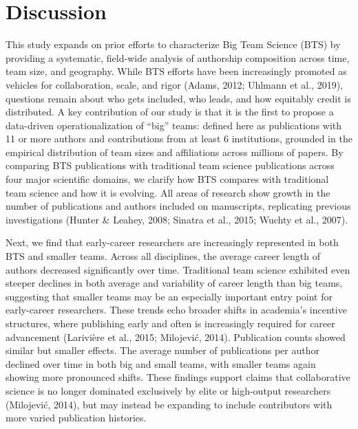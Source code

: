 \documentclass[
  man,floatsintext]{apa7}
\begin{document}
\section{Discussion}\label{discussion}

This study expands on prior efforts to characterize Big Team Science
(BTS) by providing a systematic, field-wide analysis of authorship
composition across time, team size, and geography. While BTS efforts
have been increasingly promoted as vehicles for collaboration, scale,
and rigor (Adams, 2012; Uhlmann et al., 2019), questions remain about who gets
included, who leads, and how equitably credit is distributed. A key
contribution of our study is that it is the first to propose a
data-driven operationalization of ``big'' teams: defined here as
publications with 11 or more authors and contributions from at least 6
institutions, grounded in the empirical distribution of team sizes and
affiliations across millions of papers. By comparing BTS publications
with traditional team science publications across four major scientific domains, we
clarify how BTS compares with traditional team science and how it is
evolving. All areas of research show growth in the number of
publications and authors included on manuscripts, replicating previous
investigations (Hunter \& Leahey, 2008; Sinatra et al., 2015; Wuchty et al., 2007).

Next, we find that early-career researchers are increasingly represented
in both BTS and smaller teams. Across all disciplines, the average
career length of authors decreased significantly over time. Traditional team science exhibited even steeper declines in both average and variability of
career length than big teams, suggesting that smaller teams may be an
especially important entry point for early-career researchers. These
trends echo broader shifts in academia's incentive structures, where
publishing early and often is increasingly required for career
advancement (Larivière et al., 2015; Milojević, 2014). Publication counts showed
similar but smaller effects. The average number of publications per
author declined over time in both big and small teams, with smaller
teams again showing more pronounced shifts. These findings support
claims that collaborative science is no longer dominated exclusively by
elite or high-output researchers (Milojević, 2014), but may instead be
expanding to include contributors with more varied publication
histories.
\end{document}
